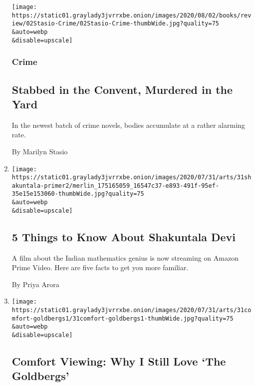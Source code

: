 \begin{enumerate}
  \texttt{[image: https://static01.graylady3jvrrxbe.onion/images/2020/08/02/books/review/02Stasio-Crime/02Stasio-Crime-thumbWide.jpg?quality=75\\\&auto=webp\\\&disable=upscale]}

  \hypertarget{crime}{%
  \subsubsection{Crime}\label{crime}}

  \hypertarget{stabbed-in-the-convent-murdered-in-the-yard}{%
  \subsection{Stabbed in the Convent, Murdered in the
  Yard}\label{stabbed-in-the-convent-murdered-in-the-yard}}

  In the newest batch of crime novels, bodies accumulate at a rather
  alarming rate.

  By Marilyn Stasio
\item
  \href{/2020/07/31/movies/shakuntala-devi-movie.html}{}

  \texttt{[image: https://static01.graylady3jvrrxbe.onion/images/2020/07/31/arts/31shakuntala-primer2/merlin\_175165059\_16547c37-e893-491f-95ef-35e15e153060-thumbWide.jpg?quality=75\\\&auto=webp\\\&disable=upscale]}

  \hypertarget{5-things-to-know-about-shakuntala-devi}{%
  \subsection{5 Things to Know About Shakuntala
  Devi}\label{5-things-to-know-about-shakuntala-devi}}

  A film about the Indian mathematics genius is now streaming on Amazon
  Prime Video. Here are five facts to get you more familiar.

  By Priya Arora
\item
  \href{/2020/07/31/arts/television/goldbergs-abc-stream.html}{}

  \texttt{[image: https://static01.graylady3jvrrxbe.onion/images/2020/07/31/arts/31comfort-goldbergs1/31comfort-goldbergs1-thumbWide.jpg?quality=75\\\&auto=webp\\\&disable=upscale]}

  \hypertarget{comfort-viewing-why-i-still-love-the-goldbergs}{%
  \subsection{Comfort Viewing: Why I Still Love `The
  Goldbergs'}\label{comfort-viewing-why-i-still-love-the-goldbergs}}


\end{enumerate}
